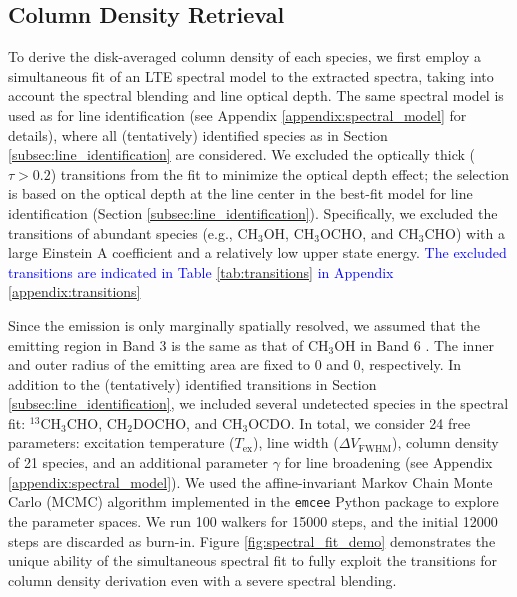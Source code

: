 \documentclass[twocolumn, twocolappendix, astrosymb, times]{aastex631}
\newcommand{\methanol}{CH$_3$OH\xspace}
\newcommand{\acetaldehyde}{CH$_3$CHO\xspace}
\newcommand{\methylformate}{CH$_3$OCHO\xspace}
\begin{document}
\subsection{Column Density Retrieval}\label{subsec:spectral_fit}
To derive the disk-averaged column density of each species, we first employ a simultaneous fit of an LTE spectral model to the extracted spectra, taking into account the spectral blending and line optical depth. The same spectral model is used as for line identification (see Appendix \ref{appendix:spectral_model} for details), where all (tentatively) identified species as in Section \ref{subsec:line_identification} are considered. We excluded the optically thick ($\tau > 0.2$) transitions from the fit to minimize the optical depth effect; the selection is based on the optical depth at the line center in the best-fit model for line identification (Section \ref{subsec:line_identification}). Specifically, we excluded the transitions of abundant species (e.g., \methanol, \methylformate, and \acetaldehyde) with a large Einstein A coefficient and a relatively low upper state energy. \textcolor{blue}{The excluded transitions are indicated in Table \ref{tab:transitions} in Appendix \ref{appendix:transitions}}


Since the emission is only marginally spatially resolved, we assumed that the emitting region in Band 3 is the same as that of \methanol in Band 6 \citep{Tobin2023}. The inner and outer radius of the emitting area are fixed to 0 and 0, respectively. 
In addition to the (tentatively) identified transitions in Section \ref{subsec:line_identification}, we included several undetected species in the spectral fit: $^{13}$CH$_3$CHO, CH$_2$DOCHO, and CH$_3$OCDO. In total, we consider 24 free parameters: excitation temperature ($T_\mathrm{ex}$), line width ($\Delta V_\mathrm{FWHM}$), column density of 21 species, and an additional parameter $\gamma$ for line broadening (see Appendix \ref{appendix:spectral_model}). 
We used the affine-invariant Markov Chain Monte Carlo (MCMC) algorithm implemented in the \texttt{emcee} Python package \citep{emcee} to explore the parameter spaces. We run 100 walkers for 15000 steps, and the initial 12000 steps are discarded as burn-in. Figure \ref{fig:spectral_fit_demo} demonstrates the unique ability of the simultaneous spectral fit to fully exploit the transitions for column density derivation even with a severe spectral blending. 
\end{document}
